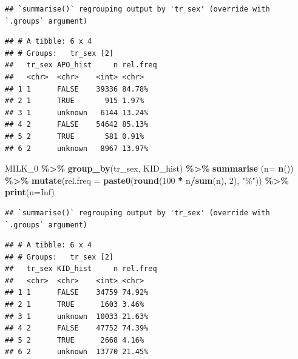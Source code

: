 \documentclass[
]{article}
\newenvironment{Shaded}{\begin{snugshade}}{\end{snugshade}}
\newcommand{\DataTypeTok}[1]{\textcolor[rgb]{0.13,0.29,0.53}{#1}}
\newcommand{\DecValTok}[1]{\textcolor[rgb]{0.00,0.00,0.81}{#1}}
\newcommand{\KeywordTok}[1]{\textcolor[rgb]{0.13,0.29,0.53}{\textbf{#1}}}
\newcommand{\NormalTok}[1]{#1}
\newcommand{\OperatorTok}[1]{\textcolor[rgb]{0.81,0.36,0.00}{\textbf{#1}}}
\newcommand{\OtherTok}[1]{\textcolor[rgb]{0.56,0.35,0.01}{#1}}
\newcommand{\StringTok}[1]{\textcolor[rgb]{0.31,0.60,0.02}{#1}}
\begin{document}
\begin{verbatim}
## `summarise()` regrouping output by 'tr_sex' (override with `.groups` argument)
\end{verbatim}

\begin{verbatim}
## # A tibble: 6 x 4
## # Groups:   tr_sex [2]
##   tr_sex APO_hist     n rel.freq
##   <chr>  <chr>    <int> <chr>   
## 1 1      FALSE    39336 84.78%  
## 2 1      TRUE       915 1.97%   
## 3 1      unknown   6144 13.24%  
## 4 2      FALSE    54642 85.13%  
## 5 2      TRUE       581 0.91%   
## 6 2      unknown   8967 13.97%
\end{verbatim}

\begin{Shaded}
\begin{Highlighting}[]
\NormalTok{MILK\_}\DecValTok{0} \OperatorTok{\%\textgreater{}\%}\StringTok{ }
\StringTok{  }\KeywordTok{group\_by}\NormalTok{(tr\_sex, KID\_hist) }\OperatorTok{\%\textgreater{}\%}\StringTok{ }
\StringTok{  }\KeywordTok{summarise}\NormalTok{ (}\DataTypeTok{n=} \KeywordTok{n}\NormalTok{()) }\OperatorTok{\%\textgreater{}\%}
\StringTok{  }\KeywordTok{mutate}\NormalTok{(}\DataTypeTok{rel.freq =} \KeywordTok{paste0}\NormalTok{(}\KeywordTok{round}\NormalTok{(}\DecValTok{100} \OperatorTok{*}\StringTok{ }\NormalTok{n}\OperatorTok{/}\KeywordTok{sum}\NormalTok{(n), }\DecValTok{2}\NormalTok{), }\StringTok{"\%"}\NormalTok{))  }\OperatorTok{\%\textgreater{}\%}\StringTok{ }
\StringTok{  }\KeywordTok{print}\NormalTok{(}\DataTypeTok{n=}\OtherTok{Inf}\NormalTok{)}
\end{Highlighting}
\end{Shaded}

\begin{verbatim}
## `summarise()` regrouping output by 'tr_sex' (override with `.groups` argument)
\end{verbatim}

\begin{verbatim}
## # A tibble: 6 x 4
## # Groups:   tr_sex [2]
##   tr_sex KID_hist     n rel.freq
##   <chr>  <chr>    <int> <chr>   
## 1 1      FALSE    34759 74.92%  
## 2 1      TRUE      1603 3.46%   
## 3 1      unknown  10033 21.63%  
## 4 2      FALSE    47752 74.39%  
## 5 2      TRUE      2668 4.16%   
## 6 2      unknown  13770 21.45%
\end{verbatim}
\end{document}
